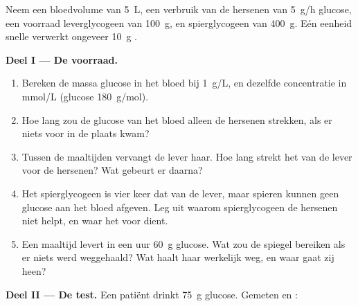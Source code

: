 \begin{problem}
\label{pb:g12:glucose-and-diabetes:1}
Neem een bloedvolume van \qty{5}{L}, een verbruik van de hersenen van
\qty{5}{g/h} glucose, een voorraad leverglycogeen van \qty{100}{g}, en
spierglycogeen van \qty{400}{g}. Eén eenheid snelle  verwerkt
ongeveer \qty{10}{g} .

\medskip
\noindent\textbf{Deel I --- De voorraad.}
\begin{enumerate}
  \item Bereken de massa glucose in het bloed bij \qty{1}{g/L}, en
        dezelfde concentratie in \unit{mmol/L} (glucose
        \qty{180}{g/mol}).
  \item Hoe lang zou de glucose van het bloed alleen de hersenen
        strekken, als er niets voor in de plaats kwam?
  \item Tussen de maaltijden vervangt de lever haar. Hoe lang strekt het
         van de lever voor de hersenen? Wat gebeurt er daarna?
  \item Het spierglycogeen is vier keer dat van de lever, maar spieren
        kunnen geen glucose aan het bloed afgeven. Leg uit waarom
        spierglycogeen de hersenen niet helpt, en waar het voor dient.
  \item Een maaltijd levert in een uur \qty{60}{g} glucose. Wat zou de
        spiegel bereiken als er niets werd weggehaald? Wat haalt haar
        werkelijk weg, en waar gaat zij heen?
\end{enumerate}

\medskip
\noindent\textbf{Deel II --- De test.}
Een patiënt drinkt \qty{75}{g} glucose. Gemeten  en :


\end{problem}
